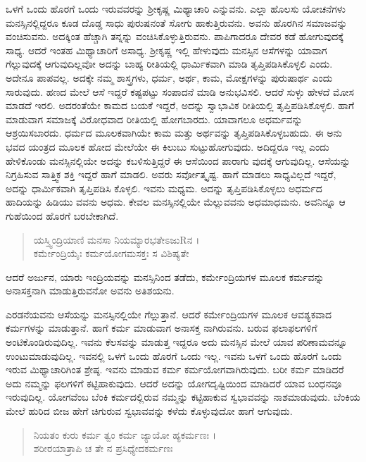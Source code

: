 ಒಳಗೆ ಒಂದು ಹೊರಗೆ ಒಂದು ಇರುವವರನ್ನು ಶ್ರೀಕೃಷ್ಣ ಮಿಥ್ಯಾಚಾರಿ ಎನ್ನುವನು. ಎಲ್ಲಾ ಹೊಲಸು ಯೋಚನೆಗಳು ಮನಸ್ಸಿನಲ್ಲಿದ್ದರೂ ಕೂಡ ದೊಡ್ಡ ಸಾಧು ಪುರುಷನಂತೆ ಸೋಗು ಹಾಕುತ್ತಿರುವನು. ಅವನು ಹೊರಗಿನ ಸಮಾಜವನ್ನು ವಂಚಿಸುವನು. ಅದಕ್ಕಿಂತ ಹೆಚ್ಚಾಗಿ ತನ್ನನ್ನು ವಂಚಿಸಿಕೊಳ್ಳುತ್ತಿರುವನು. ಪಾಪಿಗಾದರೂ ದೇವರ ಕಡೆ ಹೋಗುವುದಕ್ಕೆ ಸಾಧ್ಯ. ಆದರೆ ಇಂತಹ ಮಿಥ್ಯಾಚಾರಿಗೆ ಅಸಾಧ್ಯ. ಶ್ರೀಕೃಷ್ಣ ಇಲ್ಲಿ ಹೇಳುವುದು ಮನಸ್ಸಿನ ಆಸೆಗಳನ್ನು ಯಾವಾಗ ಗೆಲ್ಲುವುದಕ್ಕೆ ಆಗುವುದಿಲ್ಲವೋ ಅದನ್ನು ಬಾಹ್ಯ ರೀತಿಯಲ್ಲಿ ಧಾರ್ಮಿಕವಾಗಿ ಮಾಡಿ ತೃಪ್ತಿಪಡಿಸಿಕೊಳ್ಳಲಿ ಎಂದು. ಅದೇನೂ ಪಾಪವಲ್ಲ. ಅದಕ್ಕೇ ನಮ್ಮ ಶಾಸ್ತ್ರಗಳು, ಧರ್ಮ, ಅರ್ಥ, ಕಾಮ, ಮೋಕ್ಷಗಳನ್ನು ಪುರುಷಾರ್ಥ ಎಂದು ಸಾರುವುದು. ಹಣದ ಮೇಲೆ ಆಸೆ ಇದ್ದರೆ ಕಷ್ಟಪಟ್ಟು ಸಂಪಾದನೆ ಮಾಡಿ ಅನುಭವಿಸಲಿ. ಆದರೆ ಸುಳ್ಳು ಹೇಳದೆ ಮೋಸ ಮಾಡದೆ ಇರಲಿ. ಅದರಂತೆಯೇ ಕಾಮದ ಬಯಕೆ ಇದ್ದರೆ, ಅದನ್ನು ಸ್ವಾಭಾವಿಕ ರೀತಿಯಲ್ಲಿ ತೃಪ್ತಿಪಡಿಸಿಕೊಳ್ಳಲಿ. ಹಾಗೆ ಮಾಡುವಾಗ ಸಮಾಜಕ್ಕೆ ವಿರೋಧವಾದ ರೀತಿಯಲ್ಲಿ ಹೋಗಬಾರದು. ಯಾವಾಗಲೂ ಅಧರ್ಮವನ್ನು ಆಶ್ರಯಿಸಬಾರದು. ಧರ್ಮದ ಮೂಲಕವಾಗಿಯೇ ಕಾಮ ಮತ್ತು ಅರ್ಥವನ್ನು ತೃಪ್ತಿಪಡಿಸಿಕೊಳ್ಳಬಹುದು. ಈ ಅನು ಭವದ ಯಂತ್ರದ ಮೂಲಕ ಹೋದ ಮೇಲೆಯೇ ಈ ಕಿಲುಬು ಸುಟ್ಟುಹೋಗುವುದು. ಅದಿದ್ದರೂ ಇಲ್ಲ ಎಂದು ಹೇಳಿಕೊಂಡು ಮನಸ್ಸಿನಲ್ಲಿಯೇ ಅದನ್ನು ಕಬಳಿಸುತ್ತಿದ್ದರೆ ಈ ಆಸೆಯಿಂದ ಪಾರಾಗು ವುದಕ್ಕೆ ಆಗುವುದಿಲ್ಲ. ಆಸೆಯನ್ನು ನಿಗ್ರಹಿಸುವ ಸಾತ್ತ್ವಿಕ ಶಕ್ತಿ ಇದ್ದರೆ ಹಾಗೆ ಮಾಡಲಿ. ಅವರು ಸರ್ವೋತ್ಕೃಷ್ಟ. ಹಾಗೆ ಮಾಡಲು ಸಾಧ್ಯವಿಲ್ಲದೆ ಇದ್ದರೆ, ಅದನ್ನು ಧಾರ್ಮಿಕವಾಗಿ ತೃಪ್ತಿಪಡಿಸಿ ಕೊಳ್ಳಲಿ. ಇವನು ಮಧ್ಯಮ. ಅದನ್ನು ತೃಪ್ತಿಪಡಿಸಿಕೊಳ್ಳಲು ಅಧರ್ಮದ ಹಾದಿಯನ್ನು ಹಿಡಿಯು ವವನು ಅಧಮ. ಕೇವಲ ಮನಸ್ಸಿನಲ್ಲಿಯೇ ಮೆಲ್ಲುವವನು ಅಧಮಾಧಮನು. ಅವನಿನ್ನೂ ಆ ಗುಹೆಯಿಂದ ಹೊರಗೆ ಬರಬೇಕಾಗಿದೆ.

\begin{verse}
ಯಸ್ತ್ವಿಂದ್ರಿಯಾಣಿ ಮನಸಾ ನಿಯಮ್ಯಾರಭತೇಽಜುRನ ।\\ಕರ್ಮೇಂದ್ರಿಯೈಃ ಕರ್ಮಯೋಗಮಸಕ್ತಃ ಸ ವಿಶಿಷ್ಯತೇ 
\end{verse}

{\small ಆದರೆ ಅರ್ಜುನ, ಯಾರು ಇಂದ್ರಿಯವನ್ನು ಮನಸ್ಸಿನಿಂದ ತಡೆದು, ಕರ್ಮೇಂದ್ರಿಯಗಳ ಮೂಲಕ ಕರ್ಮವನ್ನು ಅನಾಸಕ್ತನಾಗಿ ಮಾಡುತ್ತಿರುವನೋ ಅವನು ಅತಿಶಯನು.}

ಎರಡನೆಯವನು ಆಸೆಯನ್ನು ಮನಸ್ಸಿನಲ್ಲಿಯೇ ಗೆಲ್ಲುತ್ತಾನೆ. ಆದರೆ ಕರ್ಮೇಂದ್ರಿಯಗಳ ಮೂಲಕ ಆವಶ್ಯಕವಾದ ಕರ್ಮಗಳನ್ನು ಮಾಡುತ್ತಾನೆ. ಹಾಗೆ ಕರ್ಮ ಮಾಡುವಾಗ ಅನಾಸಕ್ತ ನಾಗಿರುವನು. ಬರುವ ಫಲಾಫಲಗಳಿಗೆ ಅಂಟಿಕೊಂಡಿರುವುದಿಲ್ಲ. ಇವನು ಕೆಲಸವನ್ನು ಮಾಡುತ್ತ ಇದ್ದರೂ ಅದು ಮನಸ್ಸಿನ ಮೇಲೆ ಯಾವ ಪರಿಣಾಮವನ್ನೂ ಉಂಟುಮಾಡುವುದಿಲ್ಲ. ಇವನಲ್ಲಿ ಒಳಗೆ ಒಂದು ಹೊರಗೆ ಒಂದು ಇಲ್ಲ. ಇವನು ಒಳಗೆ ಒಂದು ಹೊರಗೆ ಒಂದು ಇರುವ ಮಿಥ್ಯಾಚಾರಿಗಿಂತ ಶ್ರೇಷ್ಠ. ಇವನು ಮಾಡುವ ಕರ್ಮ ಕರ್ಮಯೋಗವಾಗಿರುವುದು. ಬರೀ ಕರ್ಮ ಮಾಡಿದರೆ ಅದು ನಮ್ಮನ್ನು ಫಲಗಳಿಗೆ ಕಟ್ಟಿಹಾಕುವುದು. ಆದರೆ ಅದನ್ನು ಯೋಗದೃಷ್ಟಿಯಿಂದ ಮಾಡಿದರೆ ಯಾವ ಬಂಧನವೂ ಇರುವುದಿಲ್ಲ. ಯೋಗವೆಂಬ ಬೆಂಕಿ ಕರ್ಮದಲ್ಲಿರುವ ನಮ್ಮನ್ನು ಕಟ್ಟಿಹಾಕುವ ಸ್ವಭಾವವನ್ನು ನಾಶಮಾಡುವುದು. ಬೆಂಕಿಯ ಮೇಲೆ ಹುರಿದ ಬೀಜ ಹೇಗೆ ಚಿಗುರುವ ಸ್ವಭಾವವನ್ನು ಕಳೆದು ಕೊಳ್ಳುವುದೋ ಹಾಗೆ ಆಗುವುದು.

\begin{verse}
ನಿಯತಂ ಕುರು ಕರ್ಮ ತ್ವಂ ಕರ್ಮ ಜ್ಯಾಯೋ ಹ್ಯಕರ್ಮಣಃ ।\\ಶರೀರಯಾತ್ರಾಪಿ ಚ ತೇ ನ ಪ್ರಸಿಧ್ಯೇದಕರ್ಮಣಃ 
\end{verse}

